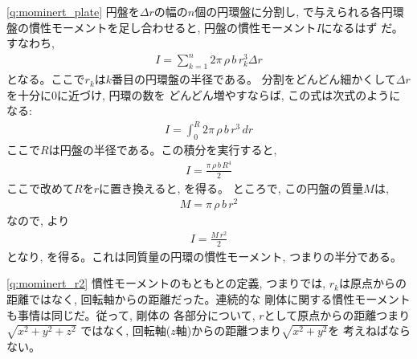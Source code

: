 \begin{q}
\ref{q:mominert_plate}
円盤を$\Delta r$の幅の$n$個の円環盤に分割し, 
で与えられる各円環盤の慣性モーメントを足し合わせると, 円盤の慣性モーメント$I$になるはず
だ。すなわち, 
\begin{eqnarray}
I=\sum_{k=1}^{n}2\pi\,\rho\,b\,r_k^3 \Delta r
\end{eqnarray}
となる。ここで$r_k$は$k$番目の円環盤の半径である。
分割をどんどん細かくして$\Delta r$を十分に0に近づけ, 円環の数を
どんどん増やすならば, この式は次式のようになる: 
\begin{eqnarray}
I=\int_{0}^{R}2\pi\,\rho\,b\,r^3\,dr
\end{eqnarray}
ここで$R$は円盤の半径である。この積分を実行すると, 
\begin{eqnarray}
I=\frac{\pi\,\rho\,b\,R^4}{2}
\end{eqnarray}
ここで改めて$R$を$r$に置き換えると, を得る。
ところで, この円盤の質量$M$は, 
\begin{eqnarray}
M=\pi\,\rho\,b\,r^2
\end{eqnarray}
なので, より
\begin{eqnarray*}
I=\frac{M\,r^2}{2}
\end{eqnarray*}
となり, を得る。これは同質量の円環の慣性モーメント, 
つまりの半分である。\mv

\ref{q:mominert_r2}
慣性モーメントのもともとの定義, つまりでは, 
$r_k$は原点からの距離ではなく, 回転軸からの距離だった。連続的な
剛体に関する慣性モーメントも事情は同じだ。従って, 剛体の
各部分について, $r$として原点からの距離つまり$\sqrt{x^2+y^2+z^2}$
ではなく, 回転軸($z$軸)からの距離つまり$\sqrt{x^2+y^2}$を
考えねばならない。\mv


\end{q}
